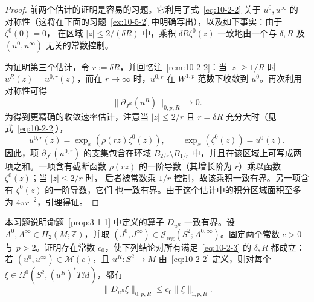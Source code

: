 \begin{proof}
前两个估计的证明是容易的习题。它利用了式~\eqref{eq:10-2-2} 关于 $u^0,u^\infty$ 的
对称性（这将在下面的习题~\ref{ex:10-5-2} 中明确写出），以及如下事实：由于 $\zeta^0(0)=0$，
在区域 $|z|\le2/(\delta R)$ 中，乘积 $\delta R\zeta^0(z)$ 一致地由一个与
$\delta,R$ 及 $(u^0,u^\infty)$ 无关的常数控制。

为证明第三个估计，令 $r:=\delta R$，并回忆注~\ref{rem:10-2-2}：当 $|z|\ge1/R$ 时
$u^R(z)=u^{0,r}(z)$，而在 $r\to\infty$ 时，$u^{0,r}$ 在 $W^{1,p}$ 范数下收敛到
$u^0$。再次利用对称性可得
\[
  \|\bar\partial_{J^R}(u^R)\|_{0,p,R}\longrightarrow0.
\]
为得到更精确的收敛速率估计，注意当 $|z|\le2/r$ 且 $r=\delta R$ 充分大时（见
式~\eqref{eq:10-2-2}），
\[
  u^{0,r}(z)=\exp_x(\rho(rz)\zeta^0(z)),
  \qquad
  \exp_x(\zeta^0(z))=u^0(z).
\]
因此，项 $\bar\partial_{J^0}(u^{0,r})$ 的支集包含在环域
$B_{2/r}\setminus B_{1/r}$ 中，并且在该区域上可写成两项之和。一项含有截断函数
$\rho(rz)$ 的一阶导数（其增长阶为 $r$）乘以函数 $\zeta^0(z)$；当 $|z|\le2/r$ 时，
后者被常数乘 $1/r$ 控制，故该乘积一致有界。另一项含有 $\zeta^0(z)$ 的一阶导数，它们
也一致有界。由于这个估计中的积分区域面积至多为 $4\pi r^{-2}$，引理得证。
\end{proof}

\begin{exercise}\label{ex:10-3-3}
本习题说明命题~\ref{prop:3-1-1} 中定义的算子 $D_{u^R}$ 一致有界。设
$A^0,A^\infty\in H_2(M;\mathbb Z)$，并取
$(J^0,J^\infty)\in\mathcal J_{\mathrm{reg}}(S^2;A^{0,\infty})$。固定两个常数
$c>0$ 与 $p>2$。证明存在常数 $c_0$，使下列结论对所有满足~\eqref{eq:10-2-3} 的
$\delta,R$ 都成立：若 $(u^0,u^\infty)\in\mathcal M(c)$，且
$u^R:S^2\to M$ 由~\eqref{eq:10-2-2} 定义，则对每个
$\xi\in\Omega^0(S^2,(u^R)^*TM)$，都有
\[
  \|D_{u^R}\xi\|_{0,p,R}\le c_0\|\xi\|_{1,p,R}.
\]
\end{exercise}

